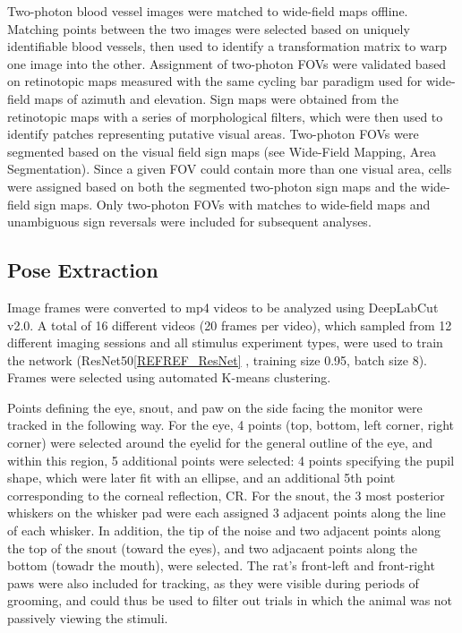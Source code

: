 Two-photon blood vessel images were matched to wide-field maps offline. Matching points between the two images were selected based on uniquely identifiable blood vessels, then used to identify a transformation matrix to warp one image into the other. Assignment of two-photon FOVs were validated based on retinotopic maps measured with the same cycling bar paradigm used for wide-field maps of azimuth and elevation. Sign maps were obtained from the retinotopic maps with a series of morphological filters\cite{Marshel2011, Garrett2014, Zhuang2017}, which were then used to identify patches representing putative visual areas. Two-photon FOVs were segmented based on the visual field sign maps (see Wide-Field Mapping, Area Segmentation). Since a given FOV could contain more than one visual area, cells were assigned based on both the segmented two-photon sign maps and the wide-field sign maps. Only two-photon FOVs with matches to wide-field maps and unambiguous sign reversals were included for subsequent analyses. 

\subsection{Pose Extraction}
Image frames were converted to mp4 videos to be analyzed using DeepLabCut v2.0\cite{Insafutdinov2016, Mathis2018, Nath2019}. A total of 16 different videos (20 frames per video), which sampled from 12 different imaging sessions and all stimulus experiment types, were used to train the network (ResNet50\ref{REFREF_ResNet} , training size 0.95, batch size 8). Frames were selected using automated K-means clustering. 

Points defining the eye, snout, and paw on the side facing the monitor were tracked in the following way. For the eye, 4 points (top, bottom, left corner, right corner) were selected around the eyelid for the general outline of the eye, and within this region, 5 additional points were selected: 4 points specifying the pupil shape, which were later fit with an ellipse, and an additional 5th point corresponding to the corneal reflection, CR. For the snout, the 3 most posterior whiskers on the whisker pad were each assigned 3 adjacent points along the line of each whisker. In addition, the tip of the noise and two adjacent points along the top of the snout (toward the eyes), and two adjacaent points along the bottom (towadr the mouth), were selected. The rat's front-left and front-right paws were also included for tracking, as they were visible during periods of grooming, and could thus be used to filter out trials in which the animal was not passively viewing the stimuli. 


